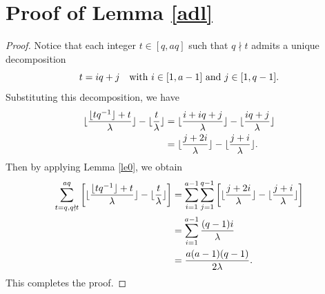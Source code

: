 \documentclass[journal,onecolumn]{IEEEtran}
\begin{document}
\section{Proof of Lemma \ref{adl}}
\begin{proof}
Notice that each integer $t\in [q,aq]$ such that $q\nmid t$ admits a unique decomposition \begin{equation*}
t=iq+j \quad \hbox{with } i\in [1,a-1] \hbox{ and } j\in [1,q-1].\end{equation*}  Substituting this decomposition, we have 
\begin{equation}\notag
\begin{split}
    \lfloor \frac{\lfloor tq^{-1}\rfloor+t}{\lambda}\rfloor- \lfloor \frac{t}{\lambda}\rfloor &= \lfloor \frac{i+iq+j}{\lambda}\rfloor-\lfloor \frac{iq+j}{\lambda}\rfloor\\
    &= \lfloor \frac{j+2i}{\lambda}\rfloor-\lfloor \frac{j+i}{\lambda}\rfloor. 
    \end{split}
    \end{equation}
Then by applying Lemma \ref{le0}, we obtain 
   \begin{equation}\notag
   \begin{split}
       \sum\limits_{t=q, q\nmid t }^{aq}\left [\lfloor \frac{\lfloor tq^{-1}\rfloor+t}{\lambda}\rfloor- \lfloor \frac{t}{\lambda}\rfloor \right]
       &=\sum\limits_{i=1}^{a-1}\sum\limits_{j=1}^{q-1}\left[ \lfloor \frac{j+2i}{\lambda}\rfloor-\lfloor \frac{j+i}{\lambda}\rfloor  \right]\\
       &=\sum\limits_{i=1}^{a-1}\frac{(q-1)i}{\lambda}\\
       &=\frac{a(a-1)(q-1)}{2\lambda}. 
       \end{split}
   \end{equation} 
   This completes the proof.
\end{proof}
\end{document}
